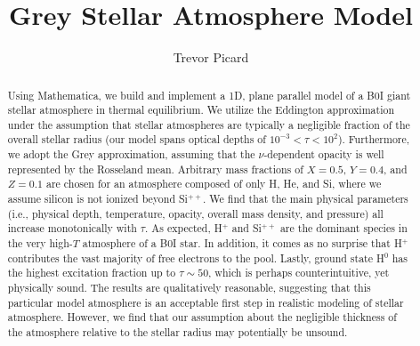 \documentclass[iop,revtex4]{emulateapj}
\begin{document}
\submitted{}
\title{Grey Stellar Atmosphere Model}


\author{Trevor Picard} 


\begin{abstract}

Using Mathematica, we build and implement a 1D, plane parallel model of a B0I giant stellar atmosphere in thermal equilibrium. We utilize the Eddington approximation under the assumption that stellar atmospheres are typically a negligible fraction of the overall stellar radius (our model spans optical depths of $10^{-3}<\tau<10^{2}$). Furthermore, we adopt the Grey approximation, assuming that the $\nu$-dependent opacity is well represented by the Rosseland mean. Arbitrary mass fractions of $X=0.5$, $Y=0.4$, and $Z=0.1$ are chosen for an atmosphere composed of only H, He, and Si, where we assume silicon is not ionized beyond Si$^{++}$. We find that the main physical parameters (i.e., physical depth, temperature, opacity, overall mass density, and pressure) all increase monotonically with $\tau$. As expected, H$^{+}$ and Si$^{++}$ are the dominant species in the very high-$T$ atmosphere of a B0I star. In addition, it comes as no surprise that H$^{+}$ contributes the vast majority of free electrons to the pool. Lastly, ground state H$^{0}$ has the highest excitation fraction up to $\tau\sim50$, which is perhaps counterintuitive, yet physically sound. The results are qualitatively reasonable, suggesting that this particular model atmosphere is an acceptable first step in realistic modeling of stellar atmosphere. However, we find that our assumption about the negligible thickness of the atmosphere relative to the stellar radius may potentially be unsound.


\end{abstract}
\end{document}
